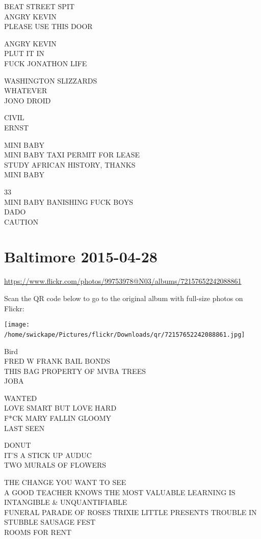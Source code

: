 \documentclass[10pt,letterpaper]{article}
\begin{document}
BEAT STREET SPIT\\
ANGRY KEVIN\\
PLEASE USE THIS DOOR

ANGRY KEVIN\\
PLUT IT IN\\
FUCK JONATHON LIFE

WASHINGTON SLIZZARDS\\
WHATEVER\\
JONO DROID

CIVIL\\
ERNST

MINI BABY\\
MINI BABY TAXI PERMIT FOR LEASE\\
STUDY AFRICAN HISTORY, THANKS\\
MINI BABY

33\\
MINI BABY BANISHING FUCK BOYS\\
DADO\\
CAUTION
\

\section*{Baltimore 2015-04-28}

\url{https://www.flickr.com/photos/99753978@N03/albums/72157652242088861}

Scan the QR code below to go to the original album with full-size photos on Flickr:

\texttt{[image: /home/swickape/Pictures/flickr/Downloads/qr/72157652242088861.jpg]}
\

Bird\\
FRED W FRANK BAIL BONDS\\
THIS BAG PROPERTY OF MVBA TREES\\
JOBA

WANTED\\
LOVE SMART BUT LOVE HARD\\
F*CK MARY FALLIN GLOOMY\\
LAST SEEN

DONUT\\
IT'S A STICK UP AUDUC\\
TWO MURALS OF FLOWERS

THE CHANGE YOU WANT TO SEE\\
A GOOD TEACHER KNOWS THE MOST VALUABLE LEARNING IS INTANGIBLE \& UNQUANTIFIABLE\\
FUNERAL PARADE OF ROSES TRIXIE LITTLE PRESENTS TROUBLE IN STUBBLE SAUSAGE FEST\\
ROOMS FOR RENT
\end{document}
